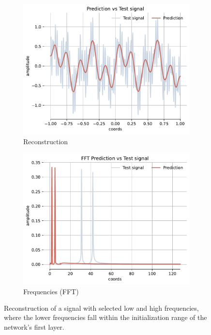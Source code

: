 \begin{figure}[h!]
    \centering
    \begin{subfigure}[b]{0.38\textwidth}
        \centering
        \includegraphics[width=\textwidth]{img/ch3/prediction_w0_2pi.pdf}
        \caption{Reconstruction}
        \label{fig:rec-2pi-w0}
    \end{subfigure}
    \begin{subfigure}[b]{0.38\textwidth}
        \centering
        \includegraphics[width=\textwidth]{img/ch3/fft_w0_2pi.pdf}
        \caption{Frequencies (FFT)}
        \label{fig:fft-low-4freqs}
    \end{subfigure}
    \label{f:4freqs-low-reconstruction}
    \caption{Reconstruction of a signal with selected low and high frequencies, where the lower frequencies fall within the initialization range of the network's first layer.}
\end{figure}

